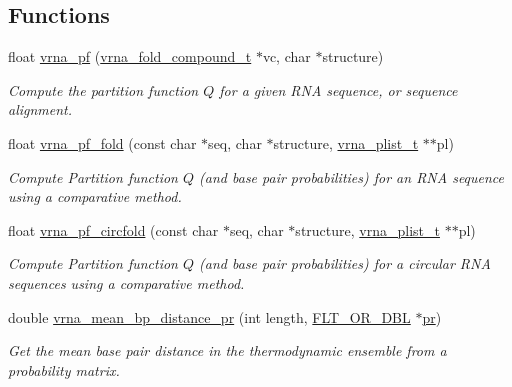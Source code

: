 \subsection*{Functions}
\begin{DoxyCompactItemize}
\item 
float \hyperlink{group__pf__fold_ga29e256d688ad221b78d37f427e0e99bc}{vrna\+\_\+pf} (\hyperlink{group__fold__compound_ga1b0cef17fd40466cef5968eaeeff6166}{vrna\+\_\+fold\+\_\+compound\+\_\+t} $\ast$vc, char $\ast$structure)
\begin{DoxyCompactList}\small\item\em Compute the partition function $Q$ for a given R\+N\+A sequence, or sequence alignment. \end{DoxyCompactList}\item 
float \hyperlink{group__pf__fold_ga59935ba485ac90f0efb5a38e2962d879}{vrna\+\_\+pf\+\_\+fold} (const char $\ast$seq, char $\ast$structure, \hyperlink{group__data__structures_ga8e4eb5e1bfc95776559575beb359af87}{vrna\+\_\+plist\+\_\+t} $\ast$$\ast$pl)
\begin{DoxyCompactList}\small\item\em Compute Partition function $Q$ (and base pair probabilities) for an R\+N\+A sequence using a comparative method. \end{DoxyCompactList}\item 
float \hyperlink{group__pf__fold_ga6dc133fce577fc0370986f3a3301cd10}{vrna\+\_\+pf\+\_\+circfold} (const char $\ast$seq, char $\ast$structure, \hyperlink{group__data__structures_ga8e4eb5e1bfc95776559575beb359af87}{vrna\+\_\+plist\+\_\+t} $\ast$$\ast$pl)
\begin{DoxyCompactList}\small\item\em Compute Partition function $Q$ (and base pair probabilities) for a circular R\+N\+A sequences using a comparative method. \end{DoxyCompactList}\item 
double \hyperlink{group__pf__fold_gad3f0c240512e6d43e2e4d4c2076021f5}{vrna\+\_\+mean\+\_\+bp\+\_\+distance\+\_\+pr} (int length, \hyperlink{group__data__structures_ga31125aeace516926bf7f251f759b6126}{F\+L\+T\+\_\+\+O\+R\+\_\+\+D\+B\+L} $\ast$\hyperlink{fold__vars_8h_ac98ec419070aee6831b44e5c700f090f}{pr})
\begin{DoxyCompactList}\small\item\em Get the mean base pair distance in the thermodynamic ensemble from a probability matrix. \end{DoxyCompactList}\item 

\end{DoxyCompactItemize}
